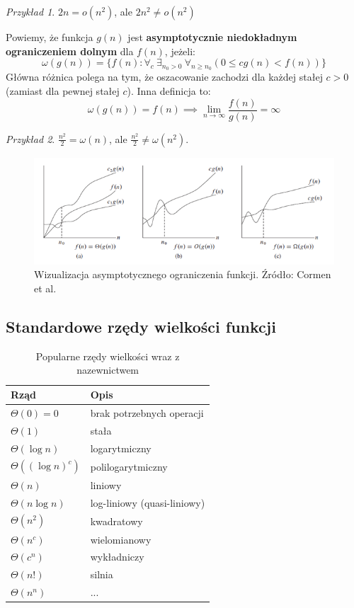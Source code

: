 \documentclass[10pt, oneside]{article}
\theoremstyle{remark}
\newtheorem*{example}{Przykład}
\begin{document}
\begin{example}
$2n = o(n^2)$, ale $2n^2 \neq o(n^2)$
\end{example}

Powiemy, że funkcja $g(n)$ jest \textbf{asymptotycznie niedokładnym ograniczeniem dolnym} dla $f(n)$, jeżeli:
$$
\omega(g(n)) = \{ f(n): \forall_{c}\ \exists_{n_0>0}\ \forall_{n \geq n_0} \left(0 \leq c g(n) < f(n)  \right) \}
$$
Główna różnica polega na tym, że oszacowanie zachodzi dla każdej stałej $c>0$ (zamiast dla pewnej stałej $c$).
Inna definicja to:
$$
\omega(g(n)) = f(n) \implies \lim_{n \to \infty} \frac{f(n)}{g(n)} = \infty
$$

\begin{example}
$\frac{n^2}{2} = \omega(n)$, ale $\frac{n^2}{2} \neq \omega(n^2)$.
\end{example}


\begin{figure}
	\centering
	\includegraphics[width=.7\linewidth]{figures/big_o}
	\caption{Wizualizacja asymptotycznego ograniczenia funkcji. Źródło: Cormen et al.}
\end{figure}

\subsection{Standardowe rzędy wielkości funkcji}

\begin{table}[]
\caption{Popularne rzędy wielkości wraz z nazewnictwem}
\centering
\begin{tabular}{@{}ll@{}}
\toprule
Rząd & Opis \\ \midrule
$\Theta(0)=0$ & brak potrzebnych operacji \\
$\Theta(1)$ & stała \\
$\Theta(\log n)$ & logarytmiczny \\
$\Theta((\log n)^c)$ & polilogarytmiczny \\
$\Theta(n)$ & liniowy \\
$\Theta(n \log n)$ & log-liniowy (quasi-liniowy) \\
$\Theta(n^2)$ & kwadratowy \\
$\Theta(n^c)$ & wielomianowy \\
$\Theta(c^n)$ & wykładniczy \\
$\Theta(n!)$ & silnia \\ 
$\Theta(n^n)$ & ... \\ \bottomrule
\end{tabular}
\end{table}
\end{document}
